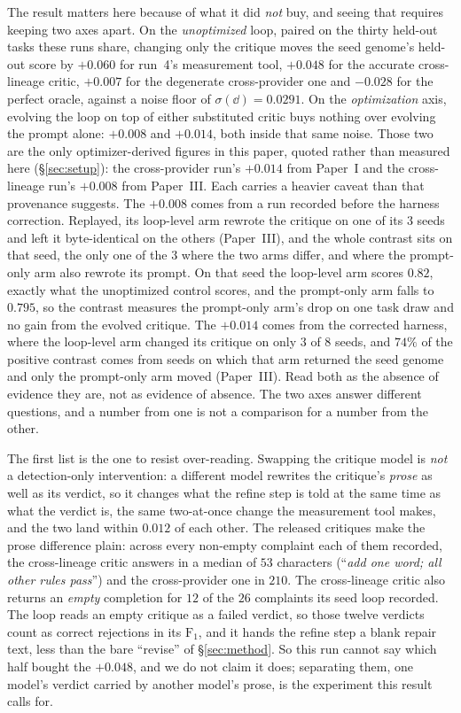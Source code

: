 \documentclass[11pt]{article}
\begin{document}
The result matters here because of what it did \emph{not} buy, and seeing that requires keeping
two axes apart. On the \emph{unoptimized} loop, paired on the thirty held-out tasks these runs
share, changing only the critique moves the seed genome's held-out score by $+0.060$ for run~4's
measurement tool, $+0.048$ for the accurate cross-lineage critic, $+0.007$ for the degenerate
cross-provider one and $-0.028$ for the perfect oracle, against a noise floor of
$\sigma(\dd) = 0.0291$. On the \emph{optimization} axis, evolving the loop on top of either
substituted critic buys nothing over evolving the prompt alone: $+0.008$ and $+0.014$, both inside
that same noise. Those two are the only optimizer-derived figures in this paper, quoted rather
than measured here (\S\ref{sec:setup}): the cross-provider run's $+0.014$ from Paper~I and the
cross-lineage run's $+0.008$ from Paper~III. Each carries a heavier caveat than that provenance
suggests. The $+0.008$ comes from a run recorded before the harness correction. Replayed, its
loop-level arm rewrote the critique on one of its $3$ seeds and left it byte-identical on the
others (Paper~III), and the whole contrast sits on that seed, the only one of the $3$ where the two
arms differ, and where the prompt-only arm also rewrote its prompt. On that seed the loop-level
arm scores $0.82$, exactly what the unoptimized control scores, and the prompt-only arm falls to
$0.795$, so the contrast measures the prompt-only arm's drop on one task draw and no gain from the
evolved critique. The $+0.014$
comes from the corrected harness, where the loop-level arm changed its critique on only $3$ of
$8$ seeds, and $74\%$ of the positive contrast comes from seeds on which that arm returned the
seed genome and only the prompt-only arm moved (Paper~III). Read both as the absence of evidence
they are, not as evidence of absence. The two axes answer different questions,
and a number from one is not a comparison for a number from the other.

The first list is the one to resist over-reading. Swapping the critique model is \emph{not} a
detection-only intervention: a different model rewrites the critique's \emph{prose} as well as its
verdict, so it changes what the refine step is told at the same time as what the verdict is, the
same two-at-once change the measurement tool makes, and the two land within $0.012$ of each other.
The released critiques make the prose difference plain: across every non-empty complaint each of
them recorded, the cross-lineage critic answers in a median of $53$ characters (``\emph{add one word;
all other rules pass}'') and the cross-provider one in $210$. The cross-lineage critic also
returns an \emph{empty} completion for $12$ of the $26$ complaints its seed loop recorded. The
loop reads an empty critique as a failed verdict, so those twelve verdicts count as correct
rejections in its $\mathrm{F}_1$, and it hands the refine step a blank repair text, less than the
bare ``revise'' of \S\ref{sec:method}. So this run
cannot say which half bought the $+0.048$, and we do not claim it does; separating them, one
model's verdict carried by another model's prose, is the experiment this result calls for.
\end{document}
